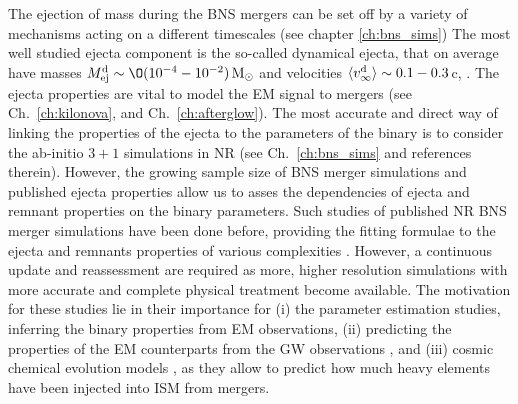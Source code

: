 The ejection of mass during the \ac{BNS} mergers can be set off by a variety of mechanisms acting
on a different timescales (see chapter \ref{ch:bns_sims}) 
%
%
The most well studied ejecta component is the so-called dynamical ejecta, that on average 
have masses $\md\sim\O(10^{-4}-10^{-2})\,\Msun$ and velocities $\langle v^{\text{d}}_\infty\rangle\sim0.1-0.3\,$c, 
\citep[\eg][]{Rosswog:1998hy,Rosswog:2005su,Hotokezaka:2013iia,Bauswein:2013yna,Wanajo:2014wha,Sekiguchi:2015dma,Radice:2016dwd,Sekiguchi:2016bjd,Vincent:2019kor}.
%
%
The ejecta properties are vital to model the \ac{EM} signal to mergers 
(see Ch.~\ref{ch:kilonova}, and Ch.~\ref{ch:afterglow}). 
%
The most accurate and direct way of linking the properties of the ejecta to the parameters of 
the binary is to consider the ab-initio $3+1$ simulations in \ac{NR}
(see Ch.~\ref{ch:bns_sims} and references therein).
%
However, the growing sample size of \ac{BNS} merger simulations and published ejecta 
properties allow us to asses the dependencies of ejecta and remnant properties on the
binary parameters.
%
Such studies of published \ac{NR} \ac{BNS} merger simulations have been done before, 
providing the fitting formulae to the ejecta and \pmerg{} remnants properties of various 
complexities \citep{Dietrich:2016fpt,Radice:2018pdn,Kruger:2020gig}. 
%
However, a continuous update and reassessment are required as more, higher resolution 
simulations with more accurate and complete physical treatment become available. 
%
The motivation for these studies lie in their importance for 
(i) the parameter estimation studies, inferring the binary properties from \ac{EM} observations,
\citep[\eg][]{Radice:2017lry,Perego:2017wtu,Coughlin:2018fis,Coughlin:2019zqi,Dietrich:2020efo} 
(ii) predicting the properties of the \ac{EM} counterparts from the \ac{GW} observations 
\citep[\eg][]{Stachie:2021noh}, and 
(iii) cosmic chemical evolution models \citep[\eg][]{Bonetti:2019fxj}, as they allow 
to predict how much heavy elements have been injected into \ac{ISM} from mergers.



